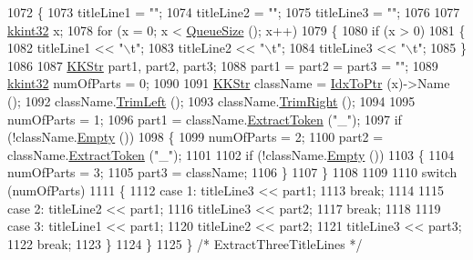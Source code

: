 \begin{DoxyCode}
1072 \{
1073   titleLine1 = \textcolor{stringliteral}{""};
1074   titleLine2 = \textcolor{stringliteral}{""};
1075   titleLine3 = \textcolor{stringliteral}{""};
1076 
1077   \hyperlink{namespace_k_k_b_a8fa4952cc84fda1de4bec1fbdd8d5b1b}{kkint32} x;
1078   \textcolor{keywordflow}{for}  (x = 0;  x < \hyperlink{class_k_k_b_1_1_k_k_queue_a1dab601f75ee6a65d97f02bddf71c40d}{QueueSize} ();  x++)
1079   \{
1080     \textcolor{keywordflow}{if}  (x > 0)
1081     \{
1082       titleLine1 << \textcolor{stringliteral}{"\(\backslash\)t"};
1083       titleLine2 << \textcolor{stringliteral}{"\(\backslash\)t"};
1084       titleLine3 << \textcolor{stringliteral}{"\(\backslash\)t"};
1085     \}
1086 
1087     \hyperlink{class_k_k_b_1_1_k_k_str}{KKStr}  part1, part2, part3;
1088     part1 = part2 = part3 = \textcolor{stringliteral}{""};
1089     \hyperlink{namespace_k_k_b_a8fa4952cc84fda1de4bec1fbdd8d5b1b}{kkint32}  numOfParts = 0;
1090 
1091     \hyperlink{class_k_k_b_1_1_k_k_str}{KKStr}  className = \hyperlink{class_k_k_b_1_1_k_k_queue_acce2bdd8b3327e38266cf198382cd852}{IdxToPtr} (x)->Name ();
1092     className.\hyperlink{class_k_k_b_1_1_k_k_str_af7c102c53103ddff3f48270b4a198c89}{TrimLeft} ();
1093     className.\hyperlink{class_k_k_b_1_1_k_k_str_aa912161f17871e2d6fec7bbac033221c}{TrimRight} ();
1094     
1095     numOfParts = 1;
1096     part1 = className.\hyperlink{class_k_k_b_1_1_k_k_str_acc31c95308d6d699debde883c11e5802}{ExtractToken} (\textcolor{stringliteral}{"\_"});
1097     \textcolor{keywordflow}{if}  (!className.\hyperlink{class_k_k_b_1_1_k_k_str_ac69942f73fffd672ec2a6e1c410afdb6}{Empty} ())
1098     \{
1099       numOfParts = 2;
1100       part2 = className.\hyperlink{class_k_k_b_1_1_k_k_str_acc31c95308d6d699debde883c11e5802}{ExtractToken} (\textcolor{stringliteral}{"\_"});
1101 
1102       \textcolor{keywordflow}{if}  (!className.\hyperlink{class_k_k_b_1_1_k_k_str_ac69942f73fffd672ec2a6e1c410afdb6}{Empty} ())
1103       \{
1104         numOfParts = 3;
1105         part3 = className;
1106       \}
1107     \}
1108 
1109 
1110     \textcolor{keywordflow}{switch}  (numOfParts)
1111     \{
1112       \textcolor{keywordflow}{case} 1: titleLine3 << part1;
1113               \textcolor{keywordflow}{break};
1114 
1115       \textcolor{keywordflow}{case} 2: titleLine2 << part1;
1116               titleLine3 << part2;
1117               \textcolor{keywordflow}{break};
1118 
1119       \textcolor{keywordflow}{case} 3: titleLine1 << part1;
1120               titleLine2 << part2;
1121               titleLine3 << part3;
1122               \textcolor{keywordflow}{break};
1123     \}
1124   \}
1125 \}  \textcolor{comment}{/* ExtractThreeTitleLines */}
\end{DoxyCode}
